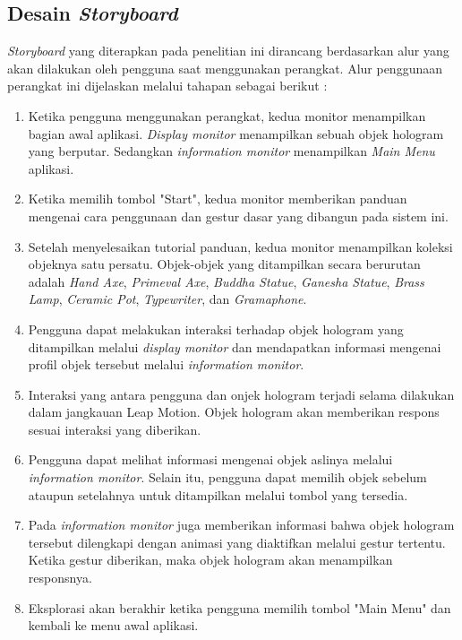 	\subsection{Desain \textit{Storyboard}}
	\vspace{1ex}
		\textit{Storyboard} yang diterapkan pada penelitian ini dirancang berdasarkan alur yang akan dilakukan oleh pengguna saat menggunakan perangkat. Alur penggunaan perangkat ini dijelaskan melalui tahapan sebagai berikut :
		\begin{enumerate}[nolistsep]
			\item Ketika pengguna menggunakan perangkat, kedua monitor menampilkan bagian awal aplikasi. \textit{Display monitor} menampilkan sebuah objek hologram yang berputar. Sedangkan \textit{information monitor} menampilkan \textit{Main Menu} aplikasi.
			\item Ketika memilih tombol "Start", kedua monitor memberikan panduan mengenai cara penggunaan dan gestur dasar yang dibangun pada sistem ini.
			\item Setelah menyelesaikan tutorial panduan, kedua monitor menampilkan koleksi objeknya satu persatu.  Objek-objek yang ditampilkan secara berurutan adalah \textit{Hand Axe}, \textit{Primeval Axe}, \textit{Buddha Statue}, \textit{Ganesha Statue}, \textit{Brass Lamp}, \textit{Ceramic Pot}, \textit{Typewriter}, dan \textit{Gramaphone}.
			\item Pengguna dapat melakukan interaksi terhadap objek hologram yang ditampilkan melalui \textit{display monitor} dan mendapatkan informasi mengenai profil objek tersebut melalui \textit{information monitor}.
			\item Interaksi yang antara pengguna dan onjek hologram terjadi selama dilakukan dalam jangkauan Leap Motion. Objek hologram akan memberikan respons sesuai interaksi yang diberikan.     
			\item Pengguna dapat melihat informasi mengenai objek aslinya melalui \textit{information monitor}. Selain itu, pengguna dapat memilih objek sebelum ataupun setelahnya untuk ditampilkan melalui tombol yang tersedia.
			\item Pada \textit{information monitor} juga memberikan informasi bahwa objek hologram tersebut dilengkapi dengan animasi yang diaktifkan melalui gestur tertentu. Ketika gestur diberikan, maka objek hologram akan menampilkan responsnya.
			\item Eksplorasi akan berakhir ketika pengguna memilih tombol "Main Menu" dan kembali ke menu awal aplikasi.
		\end{enumerate}	
	\vspace{1.5ex}
	
